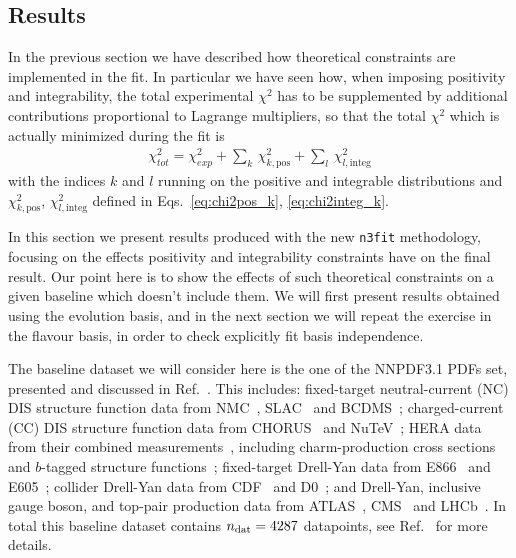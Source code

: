\subsection{Results}
\label{sec:results_nnpdf}
In the previous section we have described how theoretical constraints are implemented in the fit.
In particular we have seen how, when imposing positivity and integrability,
the total experimental $\chi^2$ has to be supplemented by additional contributions
proportional to Lagrange multipliers, so that the total $\chi^2$ which is actually minimized
during the fit is 
\begin{align}
	\label{eq:chi2pos_integ}
	\chi^2_{tot} = \chi^2_{exp} + \sum_k\, \chi^2_{k,\text{pos}} + \sum_l\, \chi^2_{l,\text{integ}}
\end{align}
with the indices $k$ and $l$ running on the positive and integrable distributions
and $\chi^2_{k,\text{pos}}$, $\chi^2_{l,\text{integ}}$ defined in Eqs.~\eqref{eq:chi2pos_k}, \eqref{eq:chi2integ_k}.

%
In this section we present results produced with the new {\tt n3fit} methodology,
focusing on the effects positivity and integrability constraints have on the final result.
Our point here is to show the effects of such theoretical constraints on a given baseline which doesn't 
include them. We will first present results obtained using the evolution basis, and in the
next section we will repeat the exercise in the flavour basis, in order to check explicitly 
fit basis independence.

%
The baseline dataset we will consider here is the one of the NNPDF3.1 PDFs set, presented and discussed in Ref.~\cite{Ball:2017nwa}.
This includes: fixed-target neutral-current 
(NC) DIS structure function data from NMC~\cite{Arneodo:1996kd,Arneodo:1996qe}, 
SLAC~\cite{Whitlow:1991uw} and BCDMS~\cite{Benvenuti:1989rh}; charged-current 
(CC) DIS structure function data from CHORUS~\cite{Onengut:2005kv} and 
NuTeV~\cite{Goncharov:2001qe,Mason:2006qa}; HERA data from their combined 
measurements~\cite{Abramowicz:2015mha}, including charm-production cross 
sections~\cite{Abramowicz:1900rp} and $b$-tagged structure 
functions~\cite{Aaron:2009af,Abramowicz:2014zub}; fixed-target Drell-Yan data 
from E866~\cite{Webb:2003ps,Webb:2003bj,Towell:2001nh} and 
E605~\cite{Moreno:1990sf}; collider Drell-Yan data from 
CDF~\cite{Aaltonen:2010zza} and D0~\cite{Abazov:2007jy,
Abazov:2013rja,D0:2014kma}; and Drell-Yan, inclusive gauge boson, and top-pair
production data from 
ATLAS~\cite{Aad:2013iua,Aad:2014qja,Aad:2011dm,Aaboud:2016btc,Aad:2015auj,
Aad:2014kva,Aaboud:2016pbd,Aad:2015mbv}, CMS~\cite{Chatrchyan:2012xt,
Chatrchyan:2013mza,Chatrchyan:2013tia,Khachatryan:2016pev,Khachatryan:2015oaa,
Khachatryan:2016mqs,Khachatryan:2015uqb,Khachatryan:2015oqa} 
and LHCb~\cite{Aaij:2012vn,Aaij:2012mda,Aaij:2015gna,Aaij:2015zlq}. 
In total this baseline dataset contains $n_{\rm dat}=4287$
datapoints, see Ref.~\cite{Ball:2017nwa} for more details.

